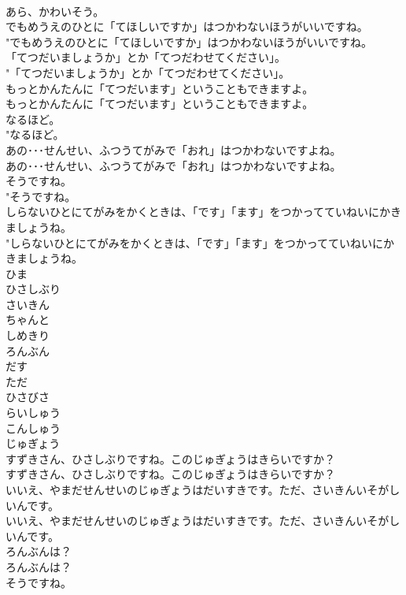 \documentclass[8pt]{extreport}
\begin{document}
\begin{CJK}{UTF8}{min}
\\	あら、かわいそう。 
\\	でもめうえのひとに「てほしいですか」はつかわないほうがいいですね。	
\\	"でもめうえのひとに「てほしいですか」はつかわないほうがいいですね。 
\\	「てつだいましょうか」とか「てつだわせてください」。	
\\	"「てつだいましょうか」とか「てつだわせてください」。 
\\	もっとかんたんに「てつだいます」ということもできますよ。	
\\	もっとかんたんに「てつだいます」ということもできますよ。 
\\	なるほど。	
\\	"なるほど。 
\\	あの･･･せんせい、ふつうてがみで「おれ」はつかわないですよね。	
\\	あの･･･せんせい、ふつうてがみで「おれ」はつかわないですよね。 
\\	そうですね。	
\\	"そうですね。 
\\	しらないひとにてがみをかくときは、「です」「ます」をつかってていねいにかきましょうね。	
\\	"しらないひとにてがみをかくときは、「です」「ます」をつかってていねいにかきましょうね。 
\\	ひま
\\	ひさしぶり
\\	さいきん
\\	ちゃんと
\\	しめきり
\\	ろんぶん
\\	だす
\\	ただ
\\	ひさびさ
\\	らいしゅう
\\	こんしゅう
\\	じゅぎょう
\\	すずきさん、ひさしぶりですね。このじゅぎょうはきらいですか？	
\\	すずきさん、ひさしぶりですね。このじゅぎょうはきらいですか？ 
\\	いいえ、やまだせんせいのじゅぎょうはだいすきです。ただ、さいきんいそがしいんです。	
\\	いいえ、やまだせんせいのじゅぎょうはだいすきです。ただ、さいきんいそがしいんです。 
\\	ろんぶんは？	
\\	ろんぶんは？ 
\\	そうですね。	

\end{CJK}
\end{document}
